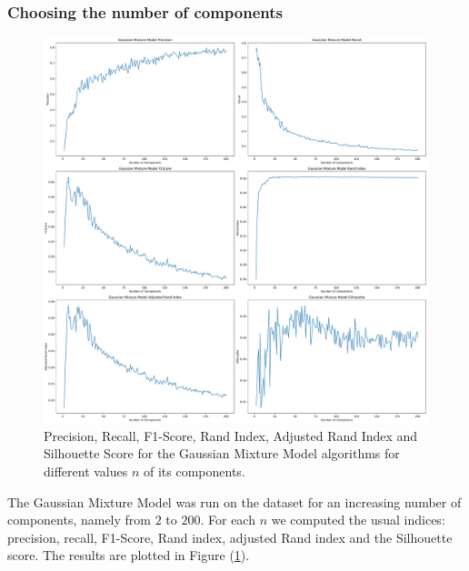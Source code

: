 \documentclass[a4paper]{article}
\begin{document}
 	\subsubsection{Choosing the number of components}
 	\begin{figure}
 		\includegraphics[width=\linewidth]{gmm_indeces.pdf}
 		\caption{Precision, Recall, F1-Score, Rand Index, Adjusted Rand Index and Silhouette Score for the Gaussian Mixture Model algorithms for different values $n$ of its components.}
 		\label{fig:gmm}
 	\end{figure}
 
 	The Gaussian Mixture Model was run on the dataset for an increasing number of components, namely from $2$ to $200$. For each $n$ we computed the usual indices: precision, recall, F1-Score, Rand index, adjusted Rand index and the Silhouette score. The results are plotted in Figure (\ref{fig:gmm}).
	
	
\end{document}
